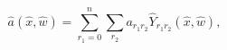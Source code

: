\begin{equation} 
\hat{a}(\hat{x},\hat{w})=\sum_{r_{1}=0}^{n}
\sum_{r_{2}} 
a_{r_{1}r_{2}}
\hat{Y}_{r_{1}r_{2}}(\hat{x},\hat{w}), 
\end{equation} 
